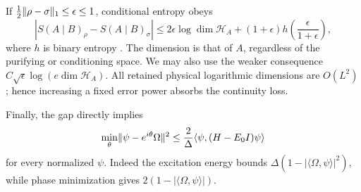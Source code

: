 If $\frac12\lVert \rho-\sigma\rVert_1\le\epsilon\le1$, conditional entropy
obeys
\begin{equation}\label{eq:entropy-continuity}
 |S(A\mid B)_\rho-S(A\mid B)_\sigma|
 \le2\epsilon\log\dim\mathcal H_A
 +(1+\epsilon)h\!\left(\frac{\epsilon}{1+\epsilon}\right),
\end{equation}
where $h$ is binary entropy \cite[Lemma~2]{Winter2016}. The dimension is
that of $A$, regardless of the purifying or conditioning space. We may
also use the weaker consequence $C\sqrt\epsilon\log(e\dim\mathcal H_A)$.
All retained physical logarithmic dimensions are $O(L^2)$; hence increasing
a fixed error power absorbs the continuity loss.

Finally, the gap directly implies
\begin{equation}\label{eq:energy-vector}
 \min_\theta\lVert \psi-e^{i\theta}\Omega\rVert^2
 \le\frac{2}{\Delta}\langle\psi,(H-E_0I)\psi\rangle
\end{equation}
for every normalized $\psi$. Indeed the excitation energy bounds
$\Delta(1-|\langle\Omega,\psi\rangle|^2)$, while phase minimization gives
$2(1-|\langle\Omega,\psi\rangle|)$.
